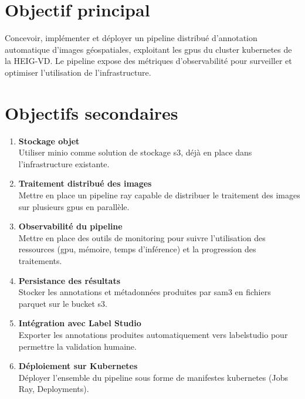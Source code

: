 \section{Objectif principal}

Concevoir, implémenter et déployer un pipeline distribué d'annotation automatique
d'images géospatiales, exploitant les \glspl{gpu} du cluster \gls{kubernetes} de la HEIG-VD.
Le pipeline expose des métriques d'observabilité pour surveiller et optimiser
l'utilisation de l'infrastructure.

\section{Objectifs secondaires}

\begin{enumerate}
    \item \textbf{Stockage objet} \\
          Utiliser \gls{minio} comme solution de stockage \gls{s3},
          déjà en place dans l'infrastructure existante.

    \item \textbf{Traitement distribué des images} \\
          Mettre en place un pipeline \gls{ray} capable de distribuer le traitement
          des images sur plusieurs \glspl{gpu} en parallèle.

    \item \textbf{Observabilité du pipeline} \\
          Mettre en place des outils de monitoring pour suivre l'utilisation des ressources
          (\gls{gpu}, mémoire, temps d'inférence) et la progression des traitements.

    \item \textbf{Persistance des résultats} \\
          Stocker les annotations et métadonnées produites par \gls{sam3}
          en fichiers \gls{parquet} sur le bucket \gls{s3}.

    \item \textbf{Intégration avec Label Studio} \\
          Exporter les annotations produites automatiquement vers \gls{labelstudio}
          pour permettre la validation humaine.

    \item \textbf{Déploiement sur Kubernetes} \\
          Déployer l'ensemble du pipeline sous forme de manifestes
          \gls{kubernetes} (Jobs Ray, Deployments).
\end{enumerate}


